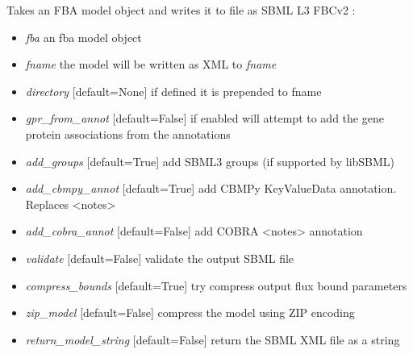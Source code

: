 \documentclass[a4paper,11pt,english]{sphinxmanual}
\begin{document}

\begin{fulllineitems}
\label{modules_doc:cbmpy.CBWrite.writeSBML3FBCV2}
Takes an FBA model object and writes it to file as SBML L3 FBCv2 :
\begin{itemize}
\item {} 
\emph{fba} an fba model object

\item {} 
\emph{fname} the model will be written as XML to \emph{fname}

\item {} 
\emph{directory} {[}default=None{]} if defined it is prepended to fname

\item {} 
\emph{gpr\_from\_annot} {[}default=False{]} if enabled will attempt to add the gene protein associations from the annotations

\item {} 
\emph{add\_groups} {[}default=True{]} add SBML3 groups (if supported by libSBML)

\item {} 
\emph{add\_cbmpy\_annot} {[}default=True{]} add CBMPy KeyValueData annotation. Replaces \textless{}notes\textgreater{}

\item {} 
\emph{add\_cobra\_annot} {[}default=False{]} add COBRA \textless{}notes\textgreater{} annotation

\item {} 
\emph{validate} {[}default=False{]} validate the output SBML file

\item {} 
\emph{compress\_bounds} {[}default=True{]} try compress output flux bound parameters

\item {} 
\emph{zip\_model} {[}default=False{]} compress the model using ZIP encoding

\item {} 
\emph{return\_model\_string} {[}default=False{]} return the SBML XML file as a string

\end{itemize}

\end{fulllineitems}
\end{document}
